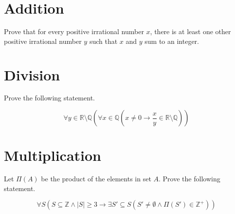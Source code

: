 \documentclass{article}
\begin{document}
\section{Addition}

Prove that for every positive irrational number $x$, there is at least one other positive irrational number $y$ such that $x$ and $y$ sum to an integer.


\section{Division}

Prove the following statement.

$$
\forall y \in \mathbb{R} \setminus \mathbb{Q} \left(
    \forall x \in \mathbb{Q} \left(
        x \neq 0
        \rightarrow
        \frac{x}{y} \in \mathbb{R \setminus Q}
    \right)
\right)
$$


\section{Multiplication}

Let $\Pi(A)$ be the product of the elements in set $A$.
Prove the following statement.

$$
\forall S \left(
    S \subseteq \mathbb{Z} \wedge |S| \geq 3
    \rightarrow
    \exists S' \subseteq S \left(
        S' \neq \emptyset \wedge \Pi(S') \in \mathbb{Z}^+
    \right)
\right)
$$
\end{document}

